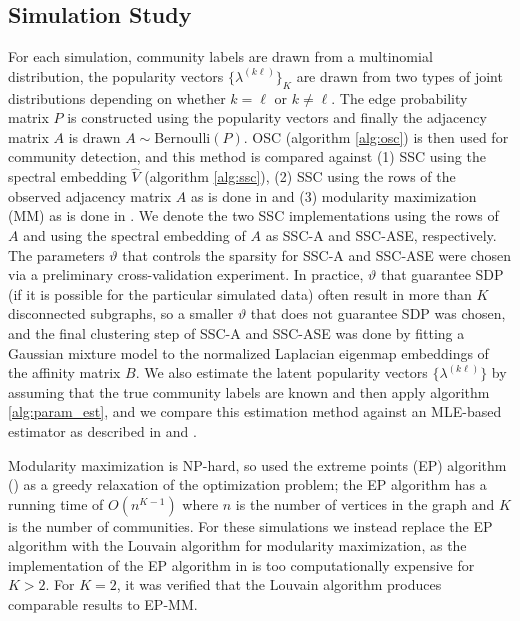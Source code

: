 \documentclass[
  12pt,
]{article}
\theoremstyle{definition}
\theoremstyle{definition}
\theoremstyle{definition}
\theoremstyle{definition}
\theoremstyle{remark}
\begin{document}
\hypertarget{simulation-study}{%
\subsection{Simulation Study}\label{simulation-study}}

For each simulation, community labels are drawn from a multinomial
distribution, the popularity vectors \(\{\lambda^{(k \ell)}\}_K\) are drawn
from two types of joint distributions depending on whether \(k = \ell\) or \(k \not = \ell\). The edge probability matrix \(P\) is constructed using the popularity
vectors and finally the adjacency matrix \(A\)
is drawn \(A \sim \mathrm{Bernoulli}(P)\). OSC (algorithm \ref{alg:osc}) is then used for community detection, and this
method is compared against (1) SSC using the spectral embedding \(\hat{V}\)
(algorithm \ref{alg:ssc}), (2) SSC using the rows of the
observed adjacency matrix \(A\) as is done in \citet{noroozi2019estimation}
and (3) modularity maximization (MM) as is done in
\citet{307cbeb9b1be48299388437423d94bf1}. We denote the two SSC
implementations using the rows of \(A\) and using the spectral embedding
of \(A\) as SSC-A and SSC-ASE, respectively.
The parameters \(\vartheta\)
that controls the sparsity for SSC-A and SSC-ASE were chosen via a preliminary cross-validation experiment.
In practice, \(\vartheta\) that guarantee SDP (if it is possible for the particular simulated data) often result in more than \(K\) disconnected subgraphs, so a smaller \(\vartheta\) that does not guarantee SDP was chosen,
and the final clustering step of SSC-A and SSC-ASE was done
by fitting a Gaussian mixture model to the normalized Laplacian
eigenmap embeddings \citep{belkin03:_laplac} of the affinity matrix \(B\).
We also estimate the latent popularity vectors \(\{\lambda^{(k \ell)}\}\)
by assuming that the true community labels are known and then apply
algorithm \ref{alg:param_est}, and we compare this estimation method against an
MLE-based estimator as described in \citet{noroozi2019estimation} and
\citet{307cbeb9b1be48299388437423d94bf1}.

Modularity maximization is NP-hard, so
\citet{307cbeb9b1be48299388437423d94bf1} used the extreme points
(EP) algorithm (\cite{le2016}) as a greedy
relaxation of the optimization problem; the EP algorithm has a running
time of \(O(n^{K-1})\) where \(n\) is the number of vertices in the graph
and \(K\) is the number of communities.
For these simulations we instead replace the EP algorithm with the
Louvain algorithm for modularity maximization,
as the implementation of the EP algorithm in
\citet{307cbeb9b1be48299388437423d94bf1} is too computationally expensive for \(K > 2\). For \(K = 2\), it
was verified that the Louvain algorithm produces comparable results
to EP-MM.
\end{document}
